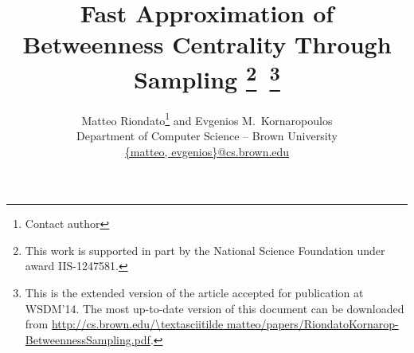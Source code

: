 \documentclass[10pt]{article}
\theoremstyle{definition}
\begin{document}
\title{Fast Approximation of Betweenness Centrality Through Sampling
\thanks{This work is supported in part by the National Science Foundation under
award IIS-1247581.}\ \footnote{This is the extended version of the article
accepted for publication at WSDM'14. The most up-to-date version of this
document can be downloaded from
\protect\url{http://cs.brown.edu/\textasciitilde
matteo/papers/RiondatoKornarop-BetweennessSampling.pdf}.}}
\author{Matteo Riondato\footnote{Contact author} and Evgenios M.~Kornaropoulos\\
Department of Computer Science -- Brown University \\
\url{{matteo, evgenios}@cs.brown.edu}}
\maketitle












\end{document}

